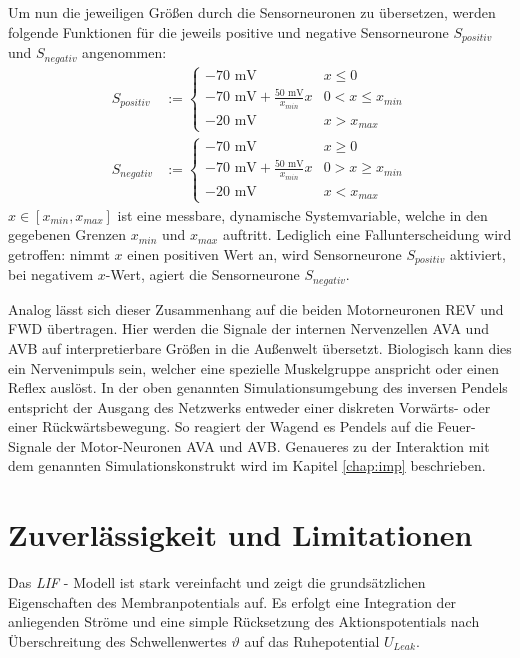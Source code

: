 	Um nun die jeweiligen Größen durch die Sensorneuronen zu übersetzen, werden folgende Funktionen für die jeweils positive und negative Sensorneurone $S_{positiv}$ und $S_{negativ}$ angenommen:
	\begin{align}
		\label{eq:sensor_translation_p}
		S_{positiv} &:= \begin{cases}-70\text{ mV} & x\leq 0\\-70\text{ mV} + \frac{50\text{ mV}}{x_{min}}x & 0 < x \leq x_{min} \\-20\text{ mV} & x > x_{max}  \end{cases}\\
		\label{eq:sensor_translation_n}
		S_{negativ} &:= \begin{cases}-70\text{ mV} & x\geq 0\\-70\text{ mV} + \frac{50\text{ mV}}{x_{min}}x & 0 > x \geq x_{min} \\-20\text{ mV} & x < x_{max}  \end{cases}
	\end{align}
	$x\in[x_{min}, x_{max}]$ ist eine messbare, dynamische Systemvariable, welche in den gegebenen Grenzen $x_{min} $ und $x_{max}$ auftritt. Lediglich eine Fallunterscheidung wird getroffen: nimmt $x$ einen positiven Wert an, wird Sensorneurone $S_{positiv}$ aktiviert, bei negativem $x$-Wert, agiert die Sensorneurone $S_{negativ}$.
	
	Analog lässt sich dieser Zusammenhang auf die beiden Motorneuronen REV und FWD übertragen. Hier werden die Signale der internen Nervenzellen AVA und AVB auf interpretierbare Größen in die Außenwelt übersetzt. Biologisch kann dies ein Nervenimpuls sein, welcher eine spezielle Muskelgruppe anspricht oder einen Reflex auslöst. In der oben genannten Simulationsumgebung des inversen Pendels entspricht der Ausgang des Netzwerks entweder einer diskreten Vorwärts- oder einer Rückwärtsbewegung. So reagiert der Wagend es Pendels auf die Feuer-Signale der Motor-Neuronen AVA und AVB. Genaueres zu der Interaktion mit dem genannten Simulationskonstrukt wird im Kapitel \ref{chap:imp} beschrieben.

\section{Zuverlässigkeit und Limitationen}
\label{sec:lif_lim}
	Das \textit{LIF} - Modell ist stark vereinfacht und zeigt die grundsätzlichen Eigenschaften des Membranpotentials auf. Es erfolgt eine Integration der anliegenden Ströme und eine simple Rücksetzung des Aktionspotentials nach Überschreitung des Schwellenwertes $\vartheta$ auf das Ruhepotential $U_{Leak}$.
	
